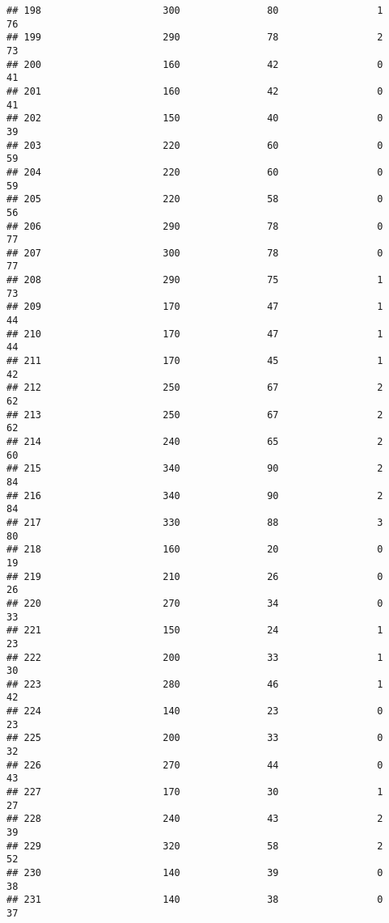 \documentclass[
]{article}
\begin{document}
\begin{verbatim}
## 198                     300               80                 1         76
## 199                     290               78                 2         73
## 200                     160               42                 0         41
## 201                     160               42                 0         41
## 202                     150               40                 0         39
## 203                     220               60                 0         59
## 204                     220               60                 0         59
## 205                     220               58                 0         56
## 206                     290               78                 0         77
## 207                     300               78                 0         77
## 208                     290               75                 1         73
## 209                     170               47                 1         44
## 210                     170               47                 1         44
## 211                     170               45                 1         42
## 212                     250               67                 2         62
## 213                     250               67                 2         62
## 214                     240               65                 2         60
## 215                     340               90                 2         84
## 216                     340               90                 2         84
## 217                     330               88                 3         80
## 218                     160               20                 0         19
## 219                     210               26                 0         26
## 220                     270               34                 0         33
## 221                     150               24                 1         23
## 222                     200               33                 1         30
## 223                     280               46                 1         42
## 224                     140               23                 0         23
## 225                     200               33                 0         32
## 226                     270               44                 0         43
## 227                     170               30                 1         27
## 228                     240               43                 2         39
## 229                     320               58                 2         52
## 230                     140               39                 0         38
## 231                     140               38                 0         37

\end{verbatim}
\end{document}

